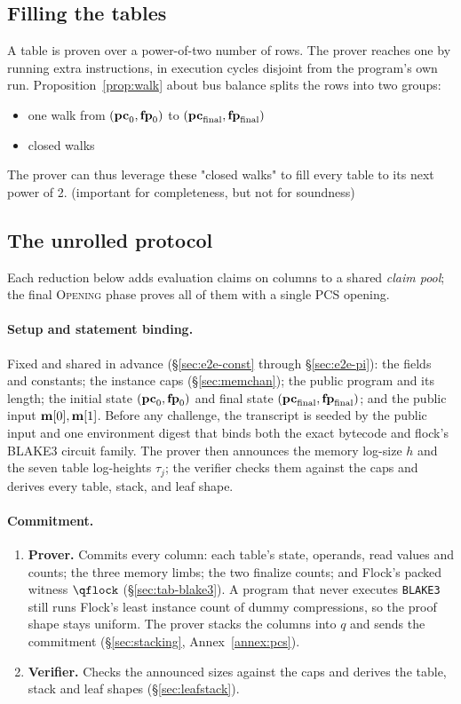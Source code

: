 \subsection{Filling the tables}\label{sec:e2e-pad}

A table is proven over a power-of-two number of rows. The prover reaches one by running extra instructions, in execution cycles disjoint from the program's own run. Proposition~\ref{prop:walk} about bus balance splits the rows into two groups:
\begin{itemize}
\item one walk from $(\mathbf{pc}_0,\mathbf{fp}_0)$ to $(\mathbf{pc}_{\mathrm{final}},\mathbf{fp}_{\mathrm{final}})$
\item closed walks
\end{itemize}
The prover can thus leverage these "closed walks" to fill every table to its next power of 2. (important for completeness, but not for soundness)

\subsection{The unrolled protocol}\label{sec:e2e-unrolled}

Each reduction below adds evaluation claims on columns to a shared \emph{claim pool}; the final \textsc{Opening} phase proves all of them with a single PCS opening.

\paragraph{Setup and statement binding.} Fixed and shared in advance (\S\ref{sec:e2e-const} through \S\ref{sec:e2e-pi}): the fields and constants; the instance caps (\S\ref{sec:memchan}); the public program and its length; the initial state $(\mathbf{pc}_0,\mathbf{fp}_0)$ and final state $(\mathbf{pc}_{\mathrm{final}},\mathbf{fp}_{\mathrm{final}})$; and the public input $\mathbf{m}[0],\mathbf{m}[1]$. Before any challenge, the transcript is seeded by the public input and one environment digest that binds both the exact bytecode and flock's BLAKE3 circuit family. The prover then announces the memory log-size $h$ and the seven table log-heights $\tau_j$; the verifier checks them against the caps and derives every table, stack, and leaf shape.

\paragraph{Commitment.}
\begin{enumerate}
\item \textbf{Prover.} Commits every column: each table's state, operands, read values and counts; the three memory limbs; the two finalize counts; and Flock's packed witness $\qflock$ (\S\ref{sec:tab-blake3}). A program that never executes \texttt{BLAKE3} still runs Flock's least instance count of dummy compressions, so the proof shape stays uniform. The prover stacks the columns into $q$ and sends the commitment (\S\ref{sec:stacking}, Annex~\ref{annex:pcs}).
\item \textbf{Verifier.} Checks the announced sizes against the caps and derives the table, stack and leaf shapes (\S\ref{sec:leafstack}).
\end{enumerate}

